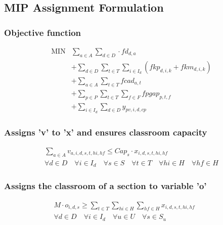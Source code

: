 
\subsection{MIP  Assignment Formulation}


\subsubsection{Objective function}
$$
\begin{array}{rl}
   \mbox{MIN} &
			\sum\limits_{a \in A}\sum\limits_{d \in D} \cdot fd_{d,a}
      \\
      &
       + \sum\limits_{d \in D} 
\sum\limits_{t \in T} \sum\limits_{i \in I_{d}} (fkp_{d,i,k} + fkm_{d,i,k})
      \\
      &
       + \sum\limits_{a \in A} \sum\limits_{t \in T} fcad_{a,t}
      \\
      &      
      + \sum\limits_{p \in P} \sum\limits_{t \in T} \sum\limits_{f \in F} fpgap_{p,t,f}
      \\
      &
      + \sum\limits_{i \in I_{d}} \sum\limits_{d \in D} y_{pv,i,d,cp}
\end{array}
$$




\subsubsection{Assigns 'v' to 'x' and ensures classroom capacity}
\begin{eqnarray}
\sum\limits_{a \in A} v_{a,i,d,s,t,hi,hf}  \le Cap_{s} \cdot x_{i,d,s,t,hi,hf} \nonumber \qquad 
\\
\forall d \in D \quad
\forall i \in I_{d} \quad 
\forall s \in S \quad
\forall t \in T \quad 
\forall hi \in H \quad 
\forall hf \in H
\end{eqnarray}

\subsubsection{Assigns the classroom of a section to variable 'o'}
\begin{eqnarray}
M \cdot o_{i,d,s}  \geq \sum\limits_{t \in T}\sum\limits_{hi \in H}\sum\limits_{hf \in H} x_{i,d,s,t,hi,hf}  \nonumber \qquad 
\\
\forall d \in D \quad
\forall i \in I_{d} \quad
\forall u \in U \quad
\forall s \in S_{u} \quad
\end{eqnarray}

